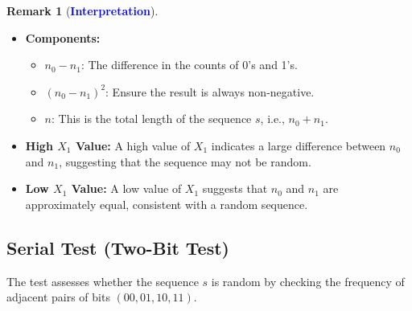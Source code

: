 \documentclass[12pt,openany]{book}
\theoremstyle{definition}
\newtheorem{remark}{Remark}[chapter]
\newcommand{\ie}{\textnormal{i.e.}}
\begin{document}
\begin{remark}[\textcolor{blue}{\bf Interpretation}]
	\ \begin{itemize}
		\item \textbf{Components:} \begin{itemize}
			\item $n_0-n_1$: The difference in the counts of 0's and 1's.
			\item $(n_0-n_1)^2$: Ensure the result is always non-negative.
			\item $n$: This is the total length of the sequence $s$, \ie, $n_0+n_1$.
		\end{itemize} 
		\item \textbf{High $X_1$ Value:} A high value of $X_1$ indicates a large difference between $n_0$ and $n_1$,
		suggesting that the sequence may not be random.
		\item \textbf{Low $X_1$ Value:} A low value of $X_1$ suggests that $n_0$ and $n_1$
		are approximately equal, consistent with a random sequence.
	\end{itemize}
\end{remark}

\subsection{Serial Test (Two-Bit Test)}
The test assesses whether the sequence $s$ is random by checking the frequency of adjacent pairs of bits $(00, 01, 10, 11)$.
\end{document}
